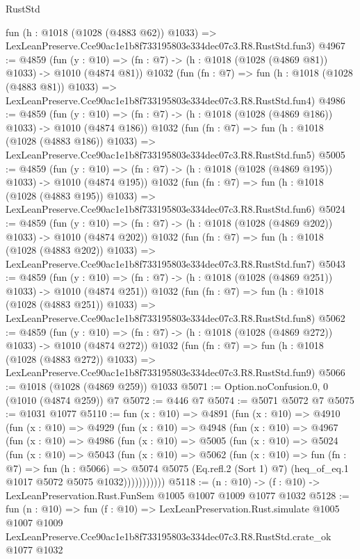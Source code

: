 \begin{lexlean}{RustStd}
\begin{coremodule}
    fun (h : @1018 (@1028 (@4883 @62)) @1033) =>
    LexLeanPreserve.Cce90ac1e1b8f733195803e334dec07c3.R8.RustStd.fun3)
@4967 := @4859
    (fun (y : @10) => (fn : @7) -> (h : @1018 (@1028 (@4869 @81)) @1033) -> @1010 (@4874 @81))
    @1032
    (fun (fn : @7) =>
    fun (h : @1018 (@1028 (@4883 @81)) @1033) =>
    LexLeanPreserve.Cce90ac1e1b8f733195803e334dec07c3.R8.RustStd.fun4)
@4986 := @4859
    (fun (y : @10) => (fn : @7) -> (h : @1018 (@1028 (@4869 @186)) @1033) -> @1010 (@4874 @186))
    @1032
    (fun (fn : @7) =>
    fun (h : @1018 (@1028 (@4883 @186)) @1033) =>
    LexLeanPreserve.Cce90ac1e1b8f733195803e334dec07c3.R8.RustStd.fun5)
@5005 := @4859
    (fun (y : @10) => (fn : @7) -> (h : @1018 (@1028 (@4869 @195)) @1033) -> @1010 (@4874 @195))
    @1032
    (fun (fn : @7) =>
    fun (h : @1018 (@1028 (@4883 @195)) @1033) =>
    LexLeanPreserve.Cce90ac1e1b8f733195803e334dec07c3.R8.RustStd.fun6)
@5024 := @4859
    (fun (y : @10) => (fn : @7) -> (h : @1018 (@1028 (@4869 @202)) @1033) -> @1010 (@4874 @202))
    @1032
    (fun (fn : @7) =>
    fun (h : @1018 (@1028 (@4883 @202)) @1033) =>
    LexLeanPreserve.Cce90ac1e1b8f733195803e334dec07c3.R8.RustStd.fun7)
@5043 := @4859
    (fun (y : @10) => (fn : @7) -> (h : @1018 (@1028 (@4869 @251)) @1033) -> @1010 (@4874 @251))
    @1032
    (fun (fn : @7) =>
    fun (h : @1018 (@1028 (@4883 @251)) @1033) =>
    LexLeanPreserve.Cce90ac1e1b8f733195803e334dec07c3.R8.RustStd.fun8)
@5062 := @4859
    (fun (y : @10) => (fn : @7) -> (h : @1018 (@1028 (@4869 @272)) @1033) -> @1010 (@4874 @272))
    @1032
    (fun (fn : @7) =>
    fun (h : @1018 (@1028 (@4883 @272)) @1033) =>
    LexLeanPreserve.Cce90ac1e1b8f733195803e334dec07c3.R8.RustStd.fun9)
@5066 := @1018 (@1028 (@4869 @259)) @1033
@5071 := Option.noConfusion.{0, 0} (@1010 (@4874 @259)) @7
@5072 := @446 @7
@5074 := @5071 @5072 @7
@5075 := @1031 @1077
@5110 := fun (x : @10) =>
  @4891
    (fun (x : @10) =>
    @4910
      (fun (x : @10) =>
      @4929
        (fun (x : @10) =>
        @4948
          (fun (x : @10) =>
          @4967
            (fun (x : @10) =>
            @4986
              (fun (x : @10) =>
              @5005
                (fun (x : @10) =>
                @5024
                  (fun (x : @10) =>
                  @5043
                    (fun (x : @10) =>
                    @5062
                      (fun (x : @10) =>
                      fun (fn : @7) =>
                      fun (h : @5066) =>
                      @5074
                        @5075
                        (Eq.refl.{2} (Sort 1) @7)
                        (heq_of_eq.{1} @1017 @5072 @5075 @1032)))))))))))
@5118 := (n : @10) -> (f : @10) -> LexLeanPreservation.Rust.FunSem @1005 @1007 @1009 @1077 @1032
@5128 := fun (n : @10) =>
  fun (f : @10) =>
  LexLeanPreservation.Rust.simulate
    @1005
    @1007
    @1009
    LexLeanPreserve.Cce90ac1e1b8f733195803e334dec07c3.R8.RustStd.crate_ok
    @1077
    @1032
\end{coremodule}
\end{lexlean}
